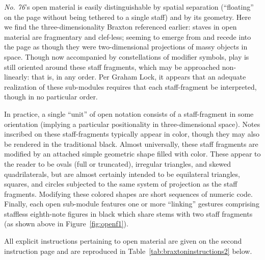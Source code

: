        \textit{No. 76}'s open material is easily distinguishable by spatial separation (``floating'' on the page without being tethered to a single staff) and by its geometry. Here we find the three-dimensionality Braxton referenced earlier: staves in open material are fragmentary and clef-less; seeming to emerge from and recede into the page as though they were two-dimensional projections of massy objects in space. Though now accompanied by constellations of modifier symbols, play is still oriented around these staff fragments, which may be approached non-linearly: that is, in any order. Per Graham Lock, it appears that an adequate realization of these sub-modules requires that each staff-fragment be interpreted, though in no particular order.\autocite[Postscript 3]{Lock_1989}
    
        In practice, a single ``unit'' of open notation consists of a staff-fragment in some orientation (implying a particular positionality in three-dimensional space). Notes inscribed on these staff-fragments typically appear in color, though they may also be rendered in the traditional black. Almost universally, these staff fragments are modified by an attached simple geometric shape filled with color. These appear to the reader to be ovals (full or truncated), irregular triangles, and skewed quadrilaterals, but are almost certainly intended to be equilateral triangles, squares, and circles subjected to the same system of projection as the staff fragments. Modifying these colored shapes are short sequences of numeric code. Finally, each open sub-module features one or more ``linking'' gestures comprising staffless eighth-note figures in black which share stems with two staff fragments (as shown above in Figure~\ref{fig:openf1}). 

        All explicit instructions pertaining to open material are given on the second instruction page and are reproduced in Table~\ref{tab:braxtoninstructions2} below. 

